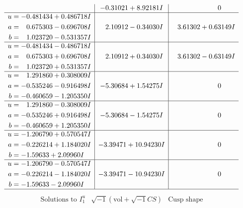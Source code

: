 \documentclass[1p]{elsarticle_modified}
\theoremstyle{definition}
\newcommand{\I}{\sqrt{-1}}
\begin{document}
$$\begin{array}{c|c|c}
 & -0.31021 + 8.92181 I & \phantom{-0.000000 } 0 \\ \hline\begin{aligned}
u &= -0.481434 + 0.486718 I \\
a &= \phantom{-}0.675303 - 0.696708 I \\
b &= \phantom{-}1.023720 - 0.531357 I\end{aligned}
 & \phantom{-}2.10912 - 0.34030 I & \phantom{-}3.61302 + 0.63149 I \\ \hline\begin{aligned}
u &= -0.481434 - 0.486718 I \\
a &= \phantom{-}0.675303 + 0.696708 I \\
b &= \phantom{-}1.023720 + 0.531357 I\end{aligned}
 & \phantom{-}2.10912 + 0.34030 I & \phantom{-}3.61302 - 0.63149 I \\ \hline\begin{aligned}
u &= \phantom{-}1.291860 + 0.308009 I \\
a &= -0.535246 - 0.916498 I \\
b &= -0.460659 - 1.205350 I\end{aligned}
 & -5.30684 + 1.54275 I & \phantom{-0.000000 } 0 \\ \hline\begin{aligned}
u &= \phantom{-}1.291860 - 0.308009 I \\
a &= -0.535246 + 0.916498 I \\
b &= -0.460659 + 1.205350 I\end{aligned}
 & -5.30684 - 1.54275 I & \phantom{-0.000000 } 0 \\ \hline\begin{aligned}
u &= -1.206790 + 0.570547 I \\
a &= -0.226214 + 1.184020 I \\
b &= -1.59633 + 2.09960 I\end{aligned}
 & -3.39471 + 10.94230 I & \phantom{-0.000000 } 0 \\ \hline\begin{aligned}
u &= -1.206790 - 0.570547 I \\
a &= -0.226214 - 1.184020 I \\
b &= -1.59633 - 2.09960 I\end{aligned}
 & -3.39471 - 10.94230 I & \phantom{-0.000000 } 0\\
 \hline 
 \end{array}$$\newpage$$\begin{array}{c|c|c}  
\text{Solutions to }I^u_{1}& \I (\text{vol} + \sqrt{-1}CS) & \text{Cusp shape}\\

\end{array}$$
\end{document}
